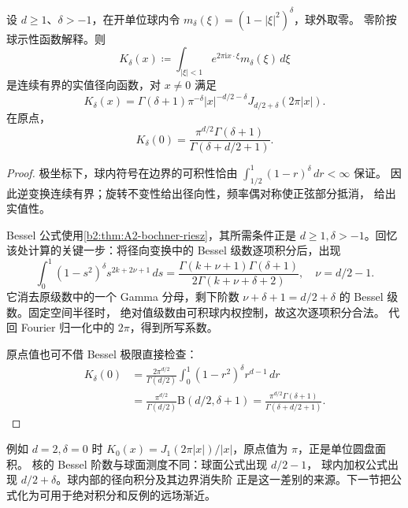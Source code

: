 \begin{proposition}\label{b2:prop:24-kernel}
设 \(d\geq1\)、\(\delta>-1\)，在开单位球内令
\(m_\delta(\xi)=(1-|\xi|^2)^\delta\)，球外取零。
零阶按球示性函数解释。则
\[
 K_\delta(x)\coloneqq\int_{|\xi|<1}
             e^{2\pi\mathrm i x\cdot\xi}m_\delta(\xi)\,d\xi
\]
是连续有界的实值径向函数，对 \(x\neq0\) 满足
\[
 K_\delta(x)=\Gamma(\delta+1)\pi^{-\delta}
       |x|^{-d/2-\delta}J_{d/2+\delta}(2\pi|x|).
\]
在原点，
\[
 K_\delta(0)=
       \frac{\pi^{d/2}\Gamma(\delta+1)}
            {\Gamma(\delta+d/2+1)}.
\]
\end{proposition}
\begin{proof}
极坐标下，球内符号在边界的可积性恰由
\(\int_{1/2}^1(1-r)^\delta\,dr<\infty\) 保证。
因此逆变换连续有界；旋转不变性给出径向性，频率偶对称使正弦部分抵消，
给出实值性。

Bessel 公式使用\cref{b2:thm:A2-bochner-riesz}，其所需条件正是
\(d\geq1,\delta>-1\)。回忆该处计算的关键一步：将径向变换中的
Bessel 级数逐项积分后，出现
\[
 \int_0^1(1-s^2)^\delta s^{2k+2\nu+1}\,ds
 =\frac{\Gamma(k+\nu+1)\Gamma(\delta+1)}
        {2\Gamma(k+\nu+\delta+2)},\quad \nu=d/2-1.
\]
它消去原级数中的一个 Gamma 分母，剩下阶数
\(\nu+\delta+1=d/2+\delta\) 的 Bessel 级数。固定空间半径时，
绝对值级数由可积球内权控制，故这次逐项积分合法。
代回 Fourier 归一化中的 \(2\pi\)，得到所写系数。

原点值也可不借 Bessel 极限直接检查：
\[
 \begin{aligned}
 K_\delta(0)
 &=\frac{2\pi^{d/2}}{\Gamma(d/2)}
             \int_0^1(1-r^2)^\delta r^{d-1}\,dr\\
 &=\frac{\pi^{d/2}}{\Gamma(d/2)}
             \mathrm B(d/2,\delta+1)
 =\frac{\pi^{d/2}\Gamma(\delta+1)}
             {\Gamma(\delta+d/2+1)}.
 \end{aligned}
\]
\end{proof}

例如 \(d=2,\delta=0\) 时
\(K_0(x)=J_1(2\pi|x|)/|x|\)，原点值为 \(\pi\)，正是单位圆盘面积。
核的 Bessel 阶数与球面测度不同：球面公式出现 \(d/2-1\)，
球内加权公式出现 \(d/2+\delta\)。球内部的径向积分及其边界消失阶
正是这一差别的来源。下一节把公式化为可用于绝对积分和反例的远场渐近。
